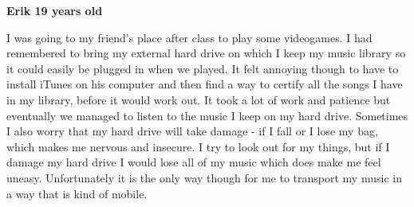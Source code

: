 \vspace{5 mm}
\noindent
\textbf{Erik 19 years old}

\vspace{5 mm}
\noindent
I was going to my friend's place after class to play some videogames. I had remembered to bring my external hard drive on which I keep my music library so it could easily be plugged in when we played. It felt annoying though to have to install iTunes on his computer and then find a way to certify all the songs I have in my library, before it would work out. It took a lot of work and patience but eventually we managed to listen to the music I keep on my hard drive. Sometimes I also worry that my hard drive will take damage - if I fall or I lose my bag, which makes me nervous and insecure. I try to look out for my things, but if I damage my hard drive I would lose all of my music which does make me feel uneasy. Unfortunately it is the only way though for me to transport my music in a way that is kind of mobile.